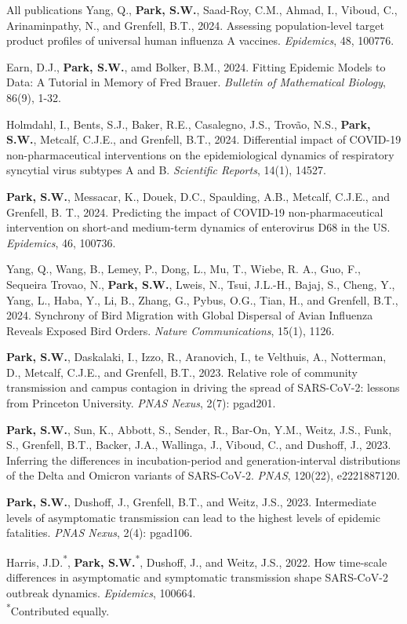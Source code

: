 \documentclass[
	11pt, %
]{resume} %
\begin{document}
\begin{rSection}{All publications}
Yang, Q., \textbf{Park, S.W.}, Saad-Roy, C.M., Ahmad, I., Viboud, C., Arinaminpathy, N., and Grenfell, B.T., 2024. Assessing population-level target product profiles of universal human influenza A vaccines. \textit{Epidemics}, 48, 100776.

Earn, D.J., \textbf{Park, S.W.}, amd Bolker, B.M., 2024. Fitting Epidemic Models to Data: A Tutorial in Memory of Fred Brauer. \textit{Bulletin of Mathematical Biology}, 86(9), 1-32.

Holmdahl, I., Bents, S.J., Baker, R.E., Casalegno, J.S., Trovão, N.S., \textbf{Park, S.W.}, Metcalf, C.J.E., and Grenfell, B.T., 2024. Differential impact of COVID-19 non-pharmaceutical interventions on the epidemiological dynamics of respiratory syncytial virus subtypes A and B. \textit{Scientific Reports}, 14(1), 14527.

\textbf{Park, S.W.}, Messacar, K., Douek, D.C., Spaulding, A.B., Metcalf, C.J.E., and Grenfell, B. T., 2024. Predicting the impact of COVID-19 non-pharmaceutical intervention on short-and medium-term dynamics of enterovirus D68 in the US. \textit{Epidemics}, 46, 100736.

Yang, Q., Wang, B., Lemey, P., Dong, L., Mu, T., Wiebe, R. A., Guo, F., Sequeira Trovao, N., \textbf{Park, S.W.}, Lweis, N., Tsui, J.L.-H., Bajaj, S., Cheng, Y., Yang, L., Haba, Y., Li, B., Zhang, G., Pybus, O.G., Tian, H., and Grenfell, B.T., 2024. Synchrony of Bird Migration with Global Dispersal of Avian Influenza Reveals Exposed Bird Orders. \textit{Nature Communications}, 15(1), 1126.

\textbf{Park, S.W.}, Daskalaki, I., Izzo, R., Aranovich, I., te Velthuis, A., Notterman, D., Metcalf, C.J.E., and Grenfell, B.T., 2023. Relative role of community transmission and campus contagion in driving the spread of SARS-CoV-2: lessons from Princeton University. \textit{PNAS Nexus}, 2(7): pgad201.

\textbf{Park, S.W.}, Sun, K., Abbott, S., Sender, R., Bar-On, Y.M., Weitz, J.S., Funk, S., Grenfell, B.T., Backer, J.A., Wallinga, J., Viboud, C., and Dushoff, J., 2023. Inferring the differences in incubation-period and generation-interval distributions of the Delta and Omicron variants of SARS-CoV-2. \textit{PNAS}, 120(22), e2221887120.

\textbf{Park, S.W.}, Dushoff, J., Grenfell, B.T., and Weitz, J.S., 2023. Intermediate levels of asymptomatic transmission can lead to the highest levels of epidemic fatalities. \textit{PNAS Nexus}, 2(4): pgad106.

Harris, J.D.\textsuperscript{*}, \textbf{Park, S.W.}\textsuperscript{*}, Dushoff, J., and Weitz, J.S., 2022. How time-scale differences in asymptomatic and symptomatic transmission shape SARS-CoV-2 outbreak dynamics. \textit{Epidemics}, 100664.\\
\textsuperscript{*}Contributed equally.


\end{rSection}
\end{document}
